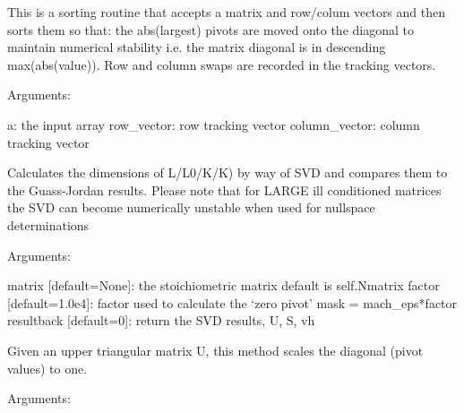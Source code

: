 \documentclass[a4paper,11pt,english]{sphinxmanual}
\begin{document}
\begin{fulllineitems}
\begin{fulllineitems}
\end{fulllineitems}


\begin{fulllineitems}
\label{modules_doc:cbmpy.PyscesStoich.Stoich.PivotSort_initial}
This is a sorting routine that accepts a matrix and row/colum vectors
and then sorts them so that: the abs(largest) pivots are moved onto the diagonal to maintain
numerical stability i.e. the matrix diagonal is in descending max(abs(value)).
Row and column swaps are recorded in the tracking vectors.

Arguments:

a: the input array
row\_vector: row tracking vector
column\_vector: column tracking vector

\end{fulllineitems}


\begin{fulllineitems}
\label{modules_doc:cbmpy.PyscesStoich.Stoich.SVD_Rank_Check}
Calculates the dimensions of L/L0/K/K) by way of SVD and compares them to the Guass-Jordan results. Please note that for LARGE ill conditioned matrices the SVD can become numerically unstable when used for nullspace determinations

Arguments:

matrix {[}default=None{]}: the stoichiometric matrix default is self.Nmatrix
factor {[}default=1.0e4{]}: factor used to calculate the `zero pivot' mask = mach\_eps*factor
resultback {[}default=0{]}: return the SVD results, U, S, vh

\end{fulllineitems}


\begin{fulllineitems}
\label{modules_doc:cbmpy.PyscesStoich.Stoich.ScalePivots}
Given an upper triangular matrix U, this method scales the diagonal (pivot values) to one.

Arguments:


\end{fulllineitems}
\end{fulllineitems}
\end{document}
